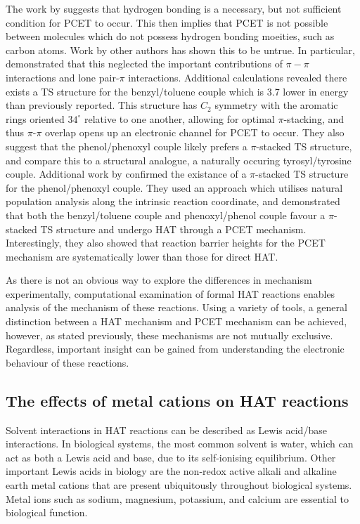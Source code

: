 The work by \citet{Mayer2002} suggests that hydrogen bonding is a necessary, but
not sufficient condition for PCET to occur. This then implies that PCET is not
possible between molecules which do not possess hydrogen bonding moeities, such
as carbon atoms. Work by other authors has shown this to be
untrue.\cite{Hatcher2007,DiLabio2007} In particular, \citet{DiLabio2007}
demonstrated that this neglected the important contributions of $\pi-\pi$
interactions and lone pair-$\pi$ interactions. Additional calculations revealed
there exists a TS structure for the benzyl/toluene couple which is 3.7 \kcalmol
lower in energy than previously reported. This structure has $C_2$ symmetry with
the aromatic rings oriented $34^\circ$ relative to one another, allowing for
optimal $\pi$-stacking, and thus $\pi$-$\pi$ overlap opens up an electronic
channel for PCET to occur. They also suggest that the phenol/phenoxyl couple
likely prefers a $\pi$-stacked TS structure, and compare this to a structural
analogue, a naturally occuring tyrosyl/tyrosine couple. Additional work by
\citet{Munoz-Rugeles2017} confirmed the existance of a $\pi$-stacked TS
structure for the phenol/phenoxyl couple. They used an approach which utilises
natural population analysis along the intrinsic reaction coordinate, and
demonstrated that both the benzyl/toluene couple and phenoxyl/phenol couple
favour a $\pi$-stacked TS structure and undergo HAT through a PCET
mechanism. Interestingly, they also showed that reaction barrier heights for the
PCET mechanism are systematically lower than those for direct HAT.

As there is not an obvious way to explore the differences in mechanism
experimentally, computational examination of formal HAT reactions enables
analysis of the mechanism of these reactions. Using a variety of tools, a
general distinction between a HAT mechanism and PCET mechanism can be achieved,
however, as stated previously, these mechanisms are not mutually
exclusive. Regardless, important insight can be gained from understanding the
electronic behaviour of these reactions.


\subsection{The effects of metal cations on HAT reactions}

Solvent interactions in HAT reactions can be described as Lewis acid/base
interactions. In biological systems, the most common solvent is water, which can
act as both a Lewis acid and base, due to its self-ionising equilibrium. Other
important Lewis acids in biology are the non-redox active alkali and alkaline
earth metal cations that are present ubiquitously throughout biological
systems. Metal ions such as sodium, magnesium, potassium, and calcium are
essential to biological function.\cite{Karp2013} 

